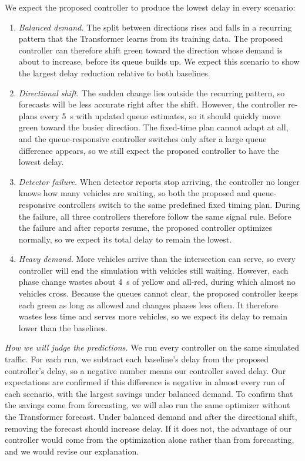 \documentclass[letterpaper,12pt,conference]{ieeeconf}
\begin{document}
We expect the proposed
controller to produce the lowest delay in every scenario:
\begin{enumerate}
\item \emph{Balanced demand.} The split between directions rises
and falls in a recurring pattern that the Transformer learns from
its training data. The proposed controller can therefore shift
green toward the direction whose demand is about to increase,
before its queue builds up. We expect this scenario to show the
largest delay reduction relative to both baselines.
\item \emph{Directional shift.} The sudden change lies outside the
recurring pattern, so forecasts will be less accurate right after
the shift. However, the controller re-plans every 5~s with updated
queue estimates, so it should quickly move green toward the busier
direction. The fixed-time plan cannot adapt at all, and the
queue-responsive controller switches only after a large queue
difference appears, so we still expect the proposed controller to
have the lowest delay.
\item \emph{Detector failure.} When detector reports stop
arriving, the controller no longer knows how many vehicles are
waiting, so both the proposed and queue-responsive controllers
switch to the same predefined fixed timing plan. During the
failure, all three controllers therefore follow the same signal
rule. Before the failure and after reports resume, the proposed
controller optimizes normally, so we expect its total delay to
remain the lowest. 
\item \emph{Heavy demand.} More vehicles arrive than the
intersection can serve, so every controller will end the
simulation with vehicles still waiting. However, each phase change
wastes about 4~s of yellow and all-red, during which almost no
vehicles cross. Because the queues cannot clear, the proposed
controller keeps each green as long as allowed and changes phases
less often. It therefore wastes less time and serves more
vehicles, so we expect its delay to remain lower than the
baselines.
\end{enumerate}

\emph{How we will judge the predictions.} We run every controller
on the same simulated traffic. For each run, we subtract each
baseline's delay from the proposed controller's delay, so a
negative number means our controller saved delay. Our expectations
are confirmed if this difference is negative in almost every run
of each scenario, with the largest savings under balanced demand.
To confirm that the savings come from forecasting, we will also
run the same optimizer without the Transformer forecast. Under
balanced demand and after the directional shift, removing the
forecast should increase delay. If it does not, the advantage of
our controller would come from the optimization alone rather than
from forecasting, and we would revise our explanation.
\end{document}
